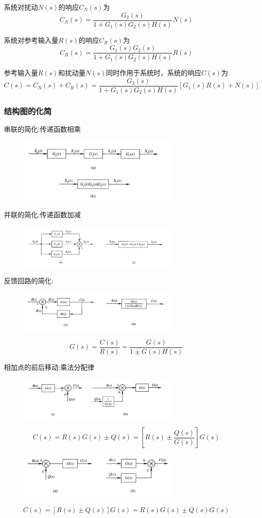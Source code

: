 \documentclass[12pt,a4paper,oneside]{ctexart}
\begin{document}
系统对扰动$N(s)$的响应$C_N(s)$为
\[
    C_N(s)=\frac{G_2(s)}{1+G_1(s)G_2(s)H(s)}N(s)
\]

系统对参考输入量$R(s)$的响应$C_R(s)$为
\[
    C_R(s) = \frac{G_1(s)G_2(s)}{1+G_1(s)G_2(s)H(s)}R(s)
\]

参考输入量$R(s)$和扰动量$N(s)$同时作用于系统时，系统的响应$C(s)$为
\[
    C(s) = C_N(s) + C_R(s) = \frac{G_2(s)}{1+G_1(s)G_2(s)H(s)}\left[G_1(s)R(s)+N(s)\right]
\]

\subsubsection{结构图的化简}
串联的简化:传递函数相乘
\begin{figure}[H]
    \centering
    \includegraphics[width=8cm]{photos/串联简化.png}
\end{figure}

并联的简化:传递函数加减
\begin{figure}[H]
    \centering
    \includegraphics[width=8cm]{photos/并联简化.png}
\end{figure}

反馈回路的简化:
\begin{figure}[H]
    \centering
    \includegraphics[width=8cm]{photos/反馈回路简化.png}
\end{figure}
\[
    G(s)=\frac{C(s)}{R(s)} = \frac{G(s)}{1\pm G(s)H(s)}
\]

相加点的前后移动:乘法分配律
\begin{figure}[H]
    \centering
    \includegraphics[width=8cm]{photos/相加点前移.png}
\end{figure}
\[
    C(s)=R(s)G(s)\pm Q(s)=[R(s)\pm \frac{Q(s)}{G(s)}]G(s)
\]
\begin{figure}[H]
    \centering
    \includegraphics[width=8cm]{photos/相加点后移.png}
\end{figure}
\[
    C(s)=[R(s)\pm Q(s)]G(s)=R(s)G(s)\pm Q(s)G(s)
\]
\end{document}

